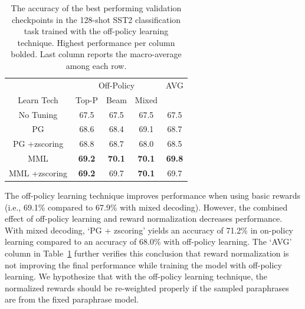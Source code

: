\documentclass[11pt]{article}
\begin{document}
\begin{table}
\centering
\caption{The accuracy of the best performing validation checkpoints in the 128-shot SST2 classification task trained with the off-policy learning technique. Highest performance per column bolded. Last column reports the macro-average among each row.}
\begin{tabular}{c | c c c | c}
\hline
& \multicolumn{3}{c|}{Off-Policy} & AVG \\
Learn Tech & \small{Top-P} & \small{Beam} & \small{Mixed} & \\
\hline
No Tuning & \small67.5 & \small67.5 & \small67.5 & \small67.5 \\
\hline
PG & \small68.6 & \small68.4 & \small69.1 & \small68.7\\
PG \small +zscoring & \small68.8 & \small68.7 & \small68.0 & \small68.5 \\
\hline
MML & \small\textbf{69.2} & \small\textbf{70.1} & \small\textbf{70.1} & \small\textbf{69.8} \\
MML \small +zscoring & \small\textbf{69.2} & \small69.7 & \small\textbf{70.1} & \small69.7\\
\hline
\end{tabular}
\label{maximum-curves-off}
\end{table}

The off-policy learning technique improves performance when using basic rewards (i.e., 69.1\% compared to 67.9\% with mixed decoding). However, the combined effect of off-policy learning and reward normalization decreases performance. With mixed decoding, `PG {\small+ zscoring}' yields an accuracy of 71.2\% in on-policy learning compared to an accuracy of 68.0\% with off-policy learning. The `AVG' column in Table~\ref{maximum-curves-off} further verifies this conclusion that reward normalization is not improving the final performance while training the model with off-policy learning. We hypothesize that with the off-policy learning technique, the normalized rewards should be re-weighted properly if the sampled paraphrases are from the fixed paraphrase model.
\end{document}
